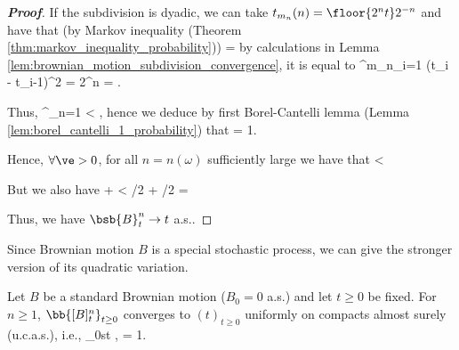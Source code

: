 \begin{proof}[\bf Proof]
If the subdivision is dyadic, we can take $t_{m_n}(n) = \floor{2^nt}2^{-n}$ and have that (by Markov inequality (Theorem \ref{thm:markov_inequality_probability}))
\be
\pro{} = \pro{} \leq {} \E{}\nonumber
\ee
by calculations in Lemma \ref{lem:brownian_motion_subdivision_convergence}, it is equal to
\be
{} \sum^{m_n}_{i=1} (t_i - t_{i-1})^2 =    2^n =  \leq {}.
\ee

Thus,
\be
\sum^\infty_{n=1} \pro{} < \infty,
\ee
hence we deduce by first Borel-Cantelli lemma (Lemma \ref{lem:borel_cantelli_1_probability}) that
\be
\pro{} = 1.
\ee

Hence, $\forall \ve >0$, for all $n = n(\omega)$ sufficiently large we have that
\be
{} < \ve {}
\ee

But we also have
\be
{} \leq {} +  < \ve/2 + \ve/2 = \ve\quad {}
\ee

Thus, we have $\bsb{B}^n_t \to t$ a.s..
\end{proof}

Since Brownian motion $B$ is a special stochastic process, we can give the stronger version of its quadratic variation.

\begin{theorem}\label{thm:brownian_motion_quadratic_variation_ucas}
Let $B$ be a standard Brownian motion ($B_0 = 0$ a.s.) and let $t \geq 0$ be fixed. For $n \geq 1$, $\bb{[B]^n_t}_{t\geq 0}$ converges to $(t)_{t\geq 0}$ uniformly on compacts almost surely (u.c.a.s.), i.e.,
\be
\sup_{0\leq s\leq t}  \quad {},\qquad {}\qquad \pro{} = 1.
\ee
\end{theorem}

